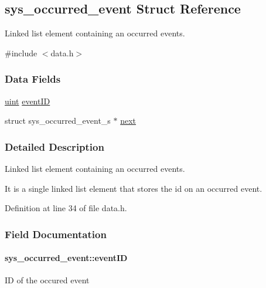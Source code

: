 \hypertarget{structsys__occurred__event}{}\subsection{sys\+\_\+occurred\+\_\+event Struct Reference}
\label{structsys__occurred__event}


Linked list element containing an occurred events.  




{\ttfamily \#include $<$data.\+h$>$}

\subsubsection*{Data Fields}
\begin{DoxyCompactItemize}
\item 
\hyperlink{definitions_8h_a1445ebbbf93d62972255ec5e89a5ab01}{uint} \hyperlink{structsys__occurred__event_a45a64745d89a02964e944e9a430596ac}{event\+I\+D}
\item 
struct sys\+\_\+occurred\+\_\+event\+\_\+s $\ast$ \hyperlink{structsys__occurred__event_a8d8c22b7afc5c9ca3f5a8fd817cfc814}{next}
\end{DoxyCompactItemize}


\subsubsection{Detailed Description}
Linked list element containing an occurred events. 

It is a single linked list element that stores the id on an occurred event. 

Definition at line 34 of file data.\+h.



\subsubsection{Field Documentation}
\hypertarget{structsys__occurred__event_a45a64745d89a02964e944e9a430596ac}{}
\paragraph[{event\+I\+D}]{ sys\+\_\+occurred\+\_\+event\+::event\+I\+D}\label{structsys__occurred__event_a45a64745d89a02964e944e9a430596ac}
I\+D of the occured event 

